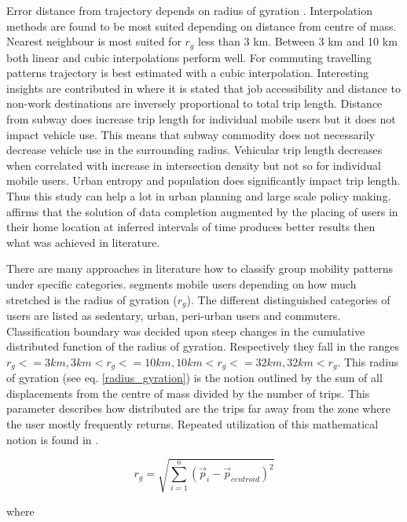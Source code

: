 \documentclass[12pt, a4paper]{report}
\theoremstyle{definition}
\theoremstyle{definition}%
\theoremstyle{definition}%
\theoremstyle{definition}%
\theoremstyle{definition}%
\theoremstyle{definition}%
\begin{document}
Error distance from trajectory depends on radius of gyration \cite{Hoteit2014}. Interpolation methods are found to be most suited depending on distance from centre of mass. Nearest neighbour is most suited for $r_{g}$ less than 3 km. Between 3 km and 10 km both linear and cubic interpolations perform well. For commuting travelling patterns trajectory is best estimated with a cubic interpolation.
Interesting insights are contributed in \cite{Calabrese2013} where it is stated that job accessibility and distance to non-work destinations are inversely proportional to total trip length. Distance from subway does increase trip length for individual mobile users but it does not impact vehicle use. This means that subway commodity does not necessarily decrease vehicle use in the surrounding radius. Vehicular trip length decreases when correlated with increase in intersection density but not so for individual mobile users. Urban entropy and population does significantly impact trip length. Thus this study can help a lot in urban planning and large scale policy making.
\cite{Hoteit2016} affirms that the solution of data completion augmented by the placing of users in their home location at inferred intervals of time produces better results then what was achieved in literature.

There are many approaches in literature how to classify group mobility patterns under specific categories.
\cite{Hoteit2014} segments mobile users depending on how much stretched is the radius of gyration (\(r_{g}\)). The different distinguished categories of users are listed as sedentary, urban, peri-urban users and commuters. Classification boundary was decided upon steep changes in the cumulative distributed function of the radius of gyration. Respectively they fall in the ranges \(r_{g} <= 3km, 3km < r_{g} <= 10km, 10km < r_{g} <= 32km, 32km < r_{g}\). This radius of gyration (see eq. \ref{radius_gyration}) is the notion outlined by the sum of all displacements from the centre of mass divided by the number of trips. This parameter describes how distributed are the trips far away from the zone where the user mostly frequently returns. Repeated utilization of this mathematical notion is found in \cite{Hoteit2014,Gonzalez2008,Hoteit2016}.

\begin{equation} \label{radius_gyration}
r_{g} = \sqrt{\sum _{i=1}^{n}({\stackrel{\to }{p}}_{i}-{\stackrel{\to }{p}}_{centroid})^2}
\end{equation}

where 
\end{document}
